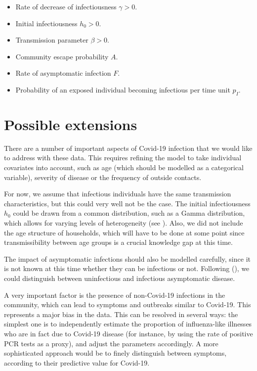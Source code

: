 \documentclass[a4paper]{article}
\begin{document}
\begin{itemize}
\item Rate of decrease of infectiousness \(\gamma >0\).
\item Initial infectiousness \(h_0 >0\).
\item Transmission parameter \(\beta >0\).
\item Community escape probability \(A\).
\item Rate of asymptomatic infection \(F\).
\item Probability of an exposed individual becoming infectious per time unit 
\(p_I\).
\end{itemize}

\section*{Possible extensions}

There are a number of important aspects of Covid-19 infection that we would like
to address with these data. This requires refining the model to take individual
covariates into account, such as age (which should be modelled as a categorical
variable), severity of disease or the frequency of outside contacts. 

For now, we assume that infectious individuals have the same transmission
characteristics, but this could very well not be the case. The initial
infectiousness \(h_0\) could be drawn from a common distribution,
such as a Gamma distribution, which allows for varying levels of heterogeneity 
(see \cite{Fraser2011}). Also, we did not include the age structure of
households, which will have to be done at some point since transmissibility
between age groups is a crucial knowledge gap at this time.

The impact of asymptomatic infections should also be modelled carefully, since
it is not known at this time whether they can be infectious or not. Following 
(\cite{Fraser2011}), we could distinguish between uninfectious and infectious
asymptomatic disease.

A very important factor is the presence of non-Covid-19 infections in the
community, which can lead to symptoms and outbreaks similar to Covid-19. This
represents a major bias in the data. This can be resolved in several ways: the
simplest one is to independently estimate the proportion of influenza-like
illnesses who are in fact due to Covid-19 disease (for instance, by using the
rate of positive PCR tests as a proxy), and adjust the parameters accordingly. A
more sophisticated approach would be to finely distinguish between symptoms,
according to their predictive value for Covid-19.
\end{document}
